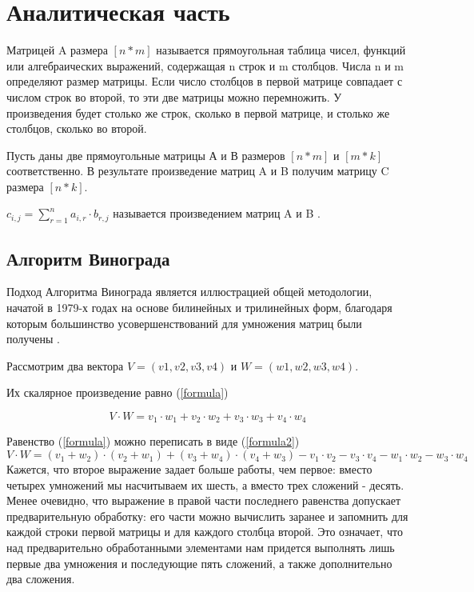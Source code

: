\documentclass[12pt]{report}
\begin{document}
\chapter{Аналитическая часть}
Матрицей A размера $[n*m]$ называется прямоугольная таблица
чисел, функций или алгебраических выражений, содержащая n строк и m столбцов. Числа n и m определяют размер матрицы\cite{Beloysov}. Если число столбцов в первой матрице совпадает с числом строк во второй, то эти две матрицы можно перемножить. У произведения будет столько же строк, сколько в первой матрице, и столько же столбцов, сколько во второй.
	    
Пусть даны две прямоугольные матрицы А и В размеров $[n * m]$ и $[m * k]$ соответственно.  
В результате произведение матриц A и B получим матрицу C размера $[n *  k]$.


$c_{i,j} = \sum\limits_{r=1}^n a_{i,r}\cdot b_{r,j}$ называется произведением матриц A и B \cite{Beloysov}.


\section{Алгоритм Винограда}
Подход Алгоритма Винограда является иллюстрацией общей методологии, начатой в 1979-х годах на основе
билинейных и трилинейных форм, благодаря которым большинство усовершенствований для умножения матриц были получены \cite{Gall2012}.

Рассмотрим два вектора $V = (v1, v2, v3, v4)$ и $W = (w1, w2, w3, w4)$.  

 Их скалярное произведение равно (\ref{formula}) 

\begin{equation} \label{formula}
V \cdot W=v_1 \cdot w_1 + v_2 \cdot w_2 + v_3 \cdot w_3 + v_4 \cdot w_4
\end{equation}

Равенство (\ref{formula}) можно переписать в виде (\ref{formula2}) 
\begin{equation} \label{formula2}
V \cdot W=(v_1 + w_2) \cdot (v_2 + w_1) + (v_3 + w_4) \cdot (v_4 + w_3) - v_1 \cdot v_2 - v_3 \cdot v_4 - w_1 \cdot w_2 - w_3 \cdot w_4
\end{equation}
Кажется, что второе выражение задает больше работы, чем первое: вместо четырех умножений мы насчитываем их шесть, а вместо трех сложений - десять. Менее очевидно, что выражение в правой части последнего равенства допускает предварительную обработку: его части можно вычислить заранее и запомнить для каждой строки первой матрицы и для каждого столбца второй. 
Это означает, что над предварительно обработанными элементами нам придется выполнять лишь первые два умножения и последующие пять сложений, а также дополнительно два сложения.
\end{document}
